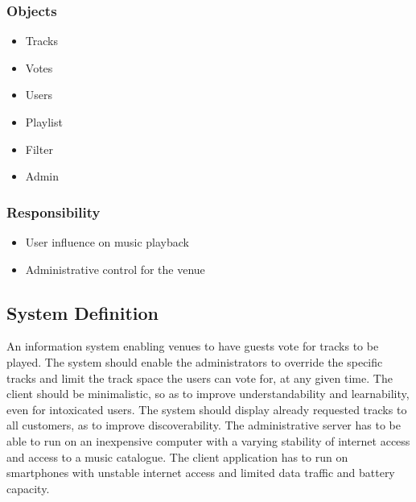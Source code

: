 \subsubsection{Objects}
\begin{itemize}
    \item Tracks
    \item Votes
    \item Users
    \item Playlist
    \item Filter
    \item Admin
\end{itemize}

\subsubsection{Responsibility}
\begin{itemize}
    \item User influence on music playback
    \item Administrative control for the venue
\end{itemize}

\subsection{System Definition}
An information system enabling venues to have guests vote for tracks to be played. The system should enable the administrators to override the specific tracks and limit the track space the users can vote for, at any given time. The client should be minimalistic, so as to improve understandability and learnability, even for intoxicated users. The system should display already requested tracks to all customers, as to improve discoverability.
The administrative server has to be able to run on an inexpensive computer with a varying stability of internet access and access to a music catalogue. The client application has to run on smartphones with unstable internet access and limited data traffic and battery capacity.
